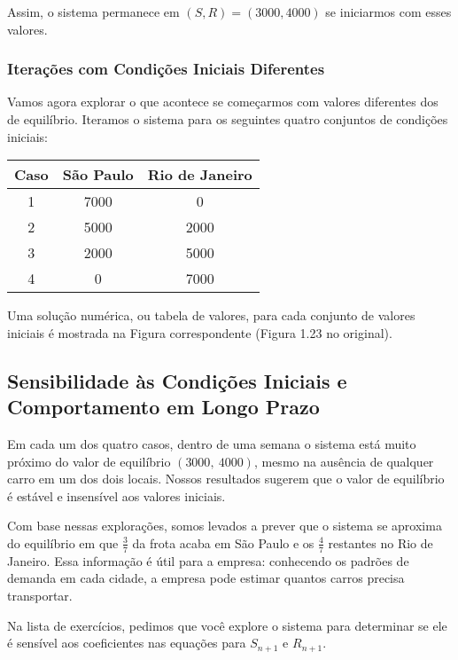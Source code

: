 \documentclass{article}
\begin{document}
Assim, o sistema permanece em \( (S, R) = (3000, 4000) \) se iniciarmos
com esses valores.

\subsubsection*{Iterações com Condições Iniciais Diferentes}

Vamos agora explorar o que acontece se começarmos com valores diferentes dos de equilíbrio. Iteramos o sistema para os seguintes quatro conjuntos de condições iniciais:

\begin{center}
\begin{tabular}{|c|c|c|}
\hline
\textbf{Caso} & \textbf{São Paulo} & \textbf{Rio de Janeiro} \\
\hline
1 & 7000 & 0 \\
2 & 5000 & 2000 \\
3 & 2000 & 5000 \\
4 & 0    & 7000 \\
\hline
\end{tabular}
\end{center}

Uma solução numérica, ou tabela de valores, para cada conjunto de
valores iniciais é mostrada na Figura correspondente (Figura 1.23 no
original).

\subsection*{Sensibilidade às Condições Iniciais e Comportamento em Longo Prazo}

Em cada um dos quatro casos, dentro de uma semana o sistema está muito
próximo do valor de equilíbrio \( (3000,\ 4000) \), mesmo na ausência
de qualquer carro em um dos dois locais. Nossos resultados sugerem que
o valor de equilíbrio é estável e insensível aos valores iniciais.

Com base nessas explorações, somos levados a prever que o sistema se
aproxima do equilíbrio em que \( \frac{3}{7} \) da frota acaba em São
Paulo e os \( \frac{4}{7} \) restantes no Rio de Janeiro. Essa
informação é útil para a empresa: conhecendo os padrões de demanda em
cada cidade, a empresa pode estimar quantos carros precisa transportar.

Na lista de exercícios, pedimos que você explore o sistema para
determinar se ele é sensível aos coeficientes nas equações para
\( S_{n+1} \) e \( R_{n+1} \).
\end{document}
